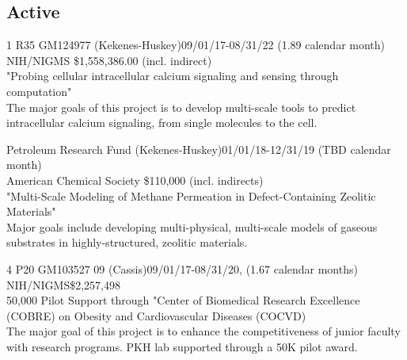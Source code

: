 \subsection{Active}
\vspace{-10pt}

1 R35 GM124977 (Kekenes-Huskey)\dapi \hfill 09/01/17-08/31/22 (1.89 calendar month) \\
NIH/NIGMS \hfill \$1,558,386.00 (incl. indirect) \\
"Probing cellular intracellular calcium signaling and sensing through computation"\\
The major goals of this project is to develop multi-scale tools to predict intracellular calcium signaling, from single molecules to the cell. %


Petroleum Research Fund (Kekenes-Huskey)\dapi   \hfill 01/01/18-12/31/19 (TBD calendar month)\\
American Chemical Society \hfill \$110,000 (incl. indirects) \\
"Multi-Scale Modeling of Methane Permeation in Defect-Containing Zeolitic Materials"\\
Major goals include developing multi-physical, multi-scale models of gaseous substrates in highly-structured, zeolitic materials. 


4 P20 GM103527	09 (Cassis)\dacoi \hfill 09/01/17-08/31/20,  (1.67 calendar months) \\
NIH/NIGMS\hfill \$2,257,498\\
50,000 Pilot Support through "Center of Biomedical Research Excellence (COBRE) on Obesity and Cardiovascular Diseases (COCVD)\\
The major goal of this project is to enhance the competitiveness of junior faculty with research programs. 
PKH lab supported through a 50K pilot award. %



